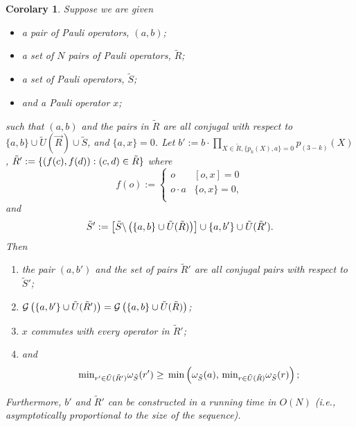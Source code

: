 \documentclass[twocolumn,showpacs,preprintnumbers,amsmath,amssymb,nofootinbib,pra,floatfix]{revtex4-1}
\newtheorem{corolary}{Corolary}
\newcommand{\lst}{\vec}
\newcommand{\set}{\tilde}
\newcommand{\genfun}{\mathcal{G}}
\begin{document}
\begin{corolary}
\label{recombination-to-make-commute}
Suppose we are given
\begin{itemize}
\item a pair of Pauli operators, $(a,b)$;
\item a set of $N$ pairs of Pauli operators, $\set R$;
\item a set of Pauli operators, $\set S$;
\item and a Pauli operator $x$;
\end{itemize}
such that $(a,b)$ and the pairs in $\set R$ are all conjugal with respect to $\{a,b\}\cup\set U(\lst R)\cup\set S$, and $\{a,x\}=0$.  Let $b' := b\cdot \prod_{X\in\set R, \{p_k(X),a\}=0} p_{(3-k)}(X)$, $\set R':=\{\paren{f(c),f(d)}: (c,d)\in\set R\}$ where
$$
f(o) :=
\begin{cases}
o & [o,x]=0 \\
o\cdot a & \{o,x\}=0, \\
\end{cases}
$$
and
$$\set S' := \left[\set S\backslash\paren{\{a,b\} \cup \set U(\set R)}\right]\cup \{a,b'\} \cup \set U(\set R').$$
Then
\begin{enumerate}
\item the pair $(a,b')$ and the set of pairs $\set R'$ are all conjugal pairs with respect to $\set S'$;
\item $\genfun\paren{\{a,b'\}\cup \set U(\set R')}=\genfun\paren{\{a,b\}\cup \set U(\set R)}$;
\item $x$ commutes with every operator in $\set R'$;
\item and $$\min_{r'\in \set U(\set R')}\om_{\set S}(r')\ge \min\paren{\om_{\set S}(a),\min_{r\in \set U(\set R)}\om_{\set S}(r)};$$
\end{enumerate}
Furthermore, $b'$ and $\set R'$ can be constructed in a running time in $O(N)$ (i.e., asymptotically proportional to the size of the sequence).
\end{corolary}
\end{document}
